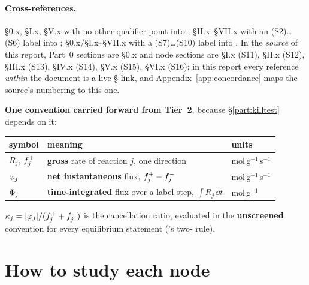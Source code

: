 \paragraph{Cross-references.} \S0.x, \S I.x, \S V.x with no other qualifier
point into ; \S II.x--\S VII.x with an (S2)\ldots(S6) label into
; \S0.x/\S I.x--\S VII.x with a (S7)\ldots(S10) label into
. In the \emph{source} of this report, Part~0 sections are \S0.x
and node sections are \S I.x (S11), \S II.x (S12), \S III.x (S13), \S IV.x
(S14), \S V.x (S15), \S VI.x (S16); in this report every reference \emph{within}
the document is a live \S-link, and Appendix~\ref{app:concordance} maps the
source's numbering to this one.

\begin{invariant}
\textbf{One convention carried forward from Tier~2}, because
\S\ref{part:killtest} depends on it:

\begin{center}
\begin{tabularx}{0.95\textwidth}{@{}L{1.8cm} Y L{2.6cm}@{}}
\toprule
\textbf{symbol} & \textbf{meaning} & \textbf{units} \\
\midrule
$R_j$, $f^{+}_j$ & \textbf{gross} rate of reaction $j$, one direction &
  mol\,g$^{-1}$\,s$^{-1}$ \\
$\varphi_j$ & \textbf{net instantaneous} flux, $f^{+}_j - f^{-}_j$ &
  mol\,g$^{-1}$\,s$^{-1}$ \\
$\Phi_j$ & \textbf{time-integrated} flux over a label step,
  $\int R_j\,\dd t$ & mol\,g$^{-1}$ \\
\bottomrule
\end{tabularx}
\end{center}

$\kappa_j = |\varphi_j| / (f^{+}_j + f^{-}_j)$ is the cancellation ratio, evaluated
in the \textbf{unscreened} convention for every equilibrium statement
('s two-\kap{} rule).
\end{invariant}

\section*{How to study each node}
\label{sec:howtostudy}


